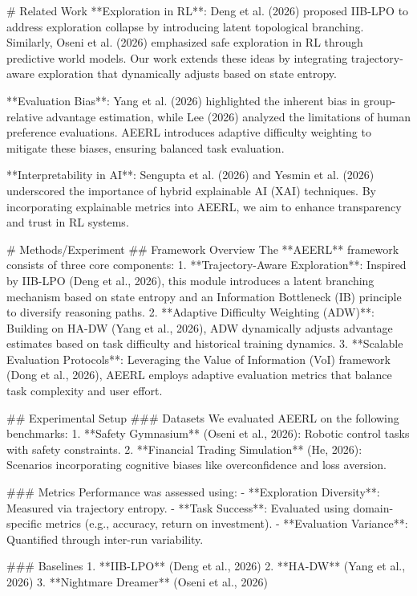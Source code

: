 # Related Work  
**Exploration in RL**: Deng et al. (2026) proposed IIB-LPO to address exploration collapse by introducing latent topological branching. Similarly, Oseni et al. (2026) emphasized safe exploration in RL through predictive world models. Our work extends these ideas by integrating trajectory-aware exploration that dynamically adjusts based on state entropy.  

**Evaluation Bias**: Yang et al. (2026) highlighted the inherent bias in group-relative advantage estimation, while Lee (2026) analyzed the limitations of human preference evaluations. AEERL introduces adaptive difficulty weighting to mitigate these biases, ensuring balanced task evaluation.  

**Interpretability in AI**: Sengupta et al. (2026) and Yesmin et al. (2026) underscored the importance of hybrid explainable AI (XAI) techniques. By incorporating explainable metrics into AEERL, we aim to enhance transparency and trust in RL systems.  

# Methods/Experiment  
## Framework Overview  
The **AEERL** framework consists of three core components:  
1. **Trajectory-Aware Exploration**: Inspired by IIB-LPO (Deng et al., 2026), this module introduces a latent branching mechanism based on state entropy and an Information Bottleneck (IB) principle to diversify reasoning paths.  
2. **Adaptive Difficulty Weighting (ADW)**: Building on HA-DW (Yang et al., 2026), ADW dynamically adjusts advantage estimates based on task difficulty and historical training dynamics.  
3. **Scalable Evaluation Protocols**: Leveraging the Value of Information (VoI) framework (Dong et al., 2026), AEERL employs adaptive evaluation metrics that balance task complexity and user effort.  

## Experimental Setup  
### Datasets  
We evaluated AEERL on the following benchmarks:  
1. **Safety Gymnasium** (Oseni et al., 2026): Robotic control tasks with safety constraints.  
2. **Financial Trading Simulation** (He, 2026): Scenarios incorporating cognitive biases like overconfidence and loss aversion.  

### Metrics  
Performance was assessed using:  
- **Exploration Diversity**: Measured via trajectory entropy.  
- **Task Success**: Evaluated using domain-specific metrics (e.g., accuracy, return on investment).  
- **Evaluation Variance**: Quantified through inter-run variability.  

### Baselines  
1. **IIB-LPO** (Deng et al., 2026)  
2. **HA-DW** (Yang et al., 2026)  
3. **Nightmare Dreamer** (Oseni et al., 2026)  


